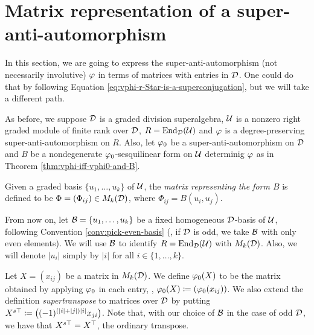\section{Matrix representation of a su\-per\--anti\--auto\-mor\-phism}

In this section, we are going to express the super-anti-automorphism (not necessarily involutive) $\varphi$ in terms of matrices with entries in $\mathcal{D}$.
One could do that by following Equation \eqref{eq:vphi-r-Star-is-a-superconjugation}, but we will take a different path.

As before, we suppose $\mathcal{D}$ is a graded division superalgebra, $\mathcal U$ is a nonzero right graded module of finite rank over $\mathcal{D}$, $R = \operatorname{End}_{\mathcal{D}} (\mathcal U)$ and $\varphi$ is a degree-preserving super-anti-automorphism on $R$.
Also, let $\varphi_0$ be a super-anti-automorphism on $\mathcal{D}$ and $B$ be a nondegenerate $\varphi_0$-sesquilinear form on $\mathcal U$ determinig $\varphi$ as in Theorem \ref{thm:vphi-iff-vphi0-and-B}.

\begin{defi}\label{def:matrix-representing-B}
	Given a graded basis $\{u_1, \ldots, u_k\}$ of $\mathcal U$, the \emph{matrix representing the form $B$} is defined to be $\Phi = (\Phi_{ij}) \in M_k(\mathcal{D})$, where $\Phi_{ij} = B(u_i, u_j)$.
\end{defi}

From now on, let $\mathcal B = \{u_1, \ldots, u_k\}$ be a fixed homogeneous $\mathcal{D}$-basis of $\mathcal U$, following Convention \ref{conv:pick-even-basis} (\ie, if $\mathcal{D}$ is odd, we take $\mathcal B$ with only even elements).
We will use $\mathcal B$ to identify $R = \operatorname{End}_{\mathcal{D}} (\mathcal U)$ with $M_k (\mathcal{D})$.
Also, we will denote $|u_i|$ simply by $|i|$ for all $i \in \{1, \ldots, k\}$.




\begin{defi}
	Let $X = (x_{ij})$ be a matrix in $M_k (\mathcal{D})$.
	We define $\varphi_0 (X)$ to be the matrix obtained by applying $\varphi_0$ in each entry, \ie, $\varphi_0 (X) \coloneqq (\varphi_0(x_{ij}))$.
	We also extend the definition \emph{supertranspose}  to matrices over $\mathcal{D}$ by putting $X^{s\top} \coloneqq \big((-1)^{(|i| + |j|) |i|} x_{ji} \big)$.
	Note that, with our choice of $\mathcal B$ in the case of odd $\mathcal{D}$, we have that $X^{s\top} = X^{\top}$, the ordinary transpose.
\end{defi}

